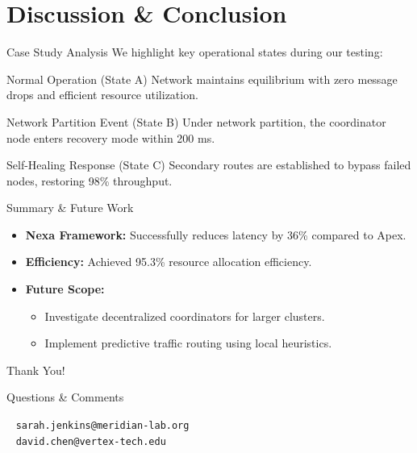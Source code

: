 \section{Discussion \& Conclusion}

\begin{frame}{Case Study Analysis}
    We highlight key operational states during our testing:
    
    \begin{block}{Normal Operation (State A)}
        Network maintains equilibrium with zero message drops and efficient resource utilization.
    \end{block}
    
    \begin{alertblock}{Network Partition Event (State B)}
        Under network partition, the coordinator node enters recovery mode within 200 ms.
    \end{alertblock}
    
    \begin{exampleblock}{Self-Healing Response (State C)}
        Secondary routes are established to bypass failed nodes, restoring 98\% throughput.
    \end{exampleblock}
\end{frame}

\begin{frame}{Summary \& Future Work}
    \begin{itemize}
        \item \textbf{Nexa Framework:} Successfully reduces latency by 36\% compared to Apex.
        \item \textbf{Efficiency:} Achieved 95.3\% resource allocation efficiency.
        \item \textbf{Future Scope:}
        \begin{itemize}
            \item Investigate decentralized coordinators for larger clusters.
            \item Implement predictive traffic routing using local heuristics.
        \end{itemize}
    \end{itemize}
\end{frame}

\begin{frame}[plain]
    \begin{center}
        \Huge \textcolor{nexa-blue}{Thank You!}
        
        \vspace{1.5cm}
        
        \large Questions \& Comments
        
        \vspace{1cm}
        
        \small
        \faEnvelope ~ \texttt{sarah.jenkins@meridian-lab.org} \\
        \faEnvelope ~ \texttt{david.chen@vertex-tech.edu}
    \end{center}
\end{frame}
